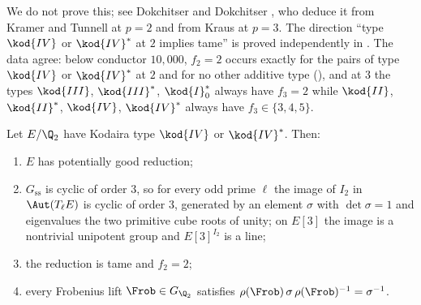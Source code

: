 We do not prove this; see Dokchitser and Dokchitser \cite[Theorem 3.1]{DokDok15}, who deduce it from Kramer and Tunnell
\cite[Proposition 8.20]{KramerTunnell82} at $p=2$ and from Kraus \cite{Kraus90} at $p=3$. The direction ``type $\kod{IV}$ or
$\kod{IV}^*$ at $2$ implies tame'' is proved independently in . The data agree: below conductor
$10{,}000$, $f_2=2$ occurs exactly for the pairs of type $\kod{IV}$ or $\kod{IV}^*$ at $2$ and for no other additive type
(), and at $3$ the types $\kod{III}$, $\kod{III}^*$, $\kod{I}_0^*$ always have $f_3=2$ while $\kod{II}$, $\kod{II}^*$,
$\kod{IV}$, $\kod{IV}^*$ always have $f_3\in\{3,4,5\}$.

\begin{corollary}\label{cor:reduction:IV-at-2}
Let $E/\Q_2$ have Kodaira type $\kod{IV}$ or $\kod{IV}^*$. Then:
\begin{enumerate}[label=(\roman*)]
\item $E$ has potentially good reduction;
\item $G_{\mathrm{ss}}$ is cyclic of order $3$, so for every odd prime $\ell$ the image of $I_2$ in $\Aut(T_\ell E)$ is cyclic of
order $3$, generated by an element $\sigma$ with $\det\sigma=1$ and eigenvalues the two primitive cube roots of unity; on
$E[3]$ the image is a nontrivial unipotent group and $E[3]^{I_2}$ is a line;
\item the reduction is tame and $f_2=2$;
\item every Frobenius lift $\Frob\in G_{\Q_2}$ satisfies $\rho(\Frob)\,\sigma\,\rho(\Frob)^{-1}=\sigma^{-1}$.
\end{enumerate}
\end{corollary}

